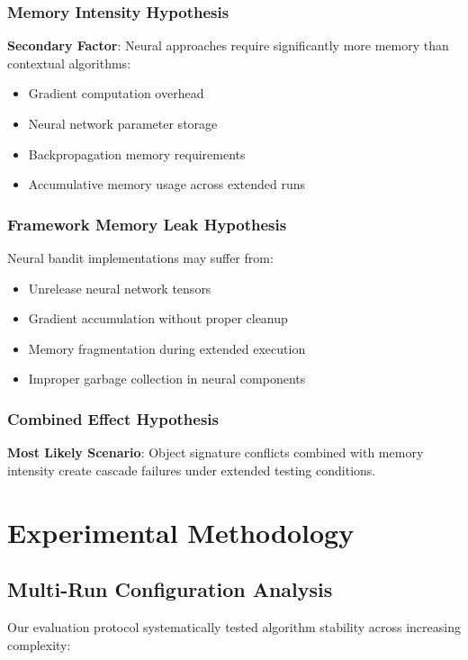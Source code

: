\documentclass[12pt,a4paper]{article}
\newcommand{\critical}[1]{\textcolor{criticalcolor}{\textbf{#1}}}
\newcommand{\warning}[1]{\textcolor{warningcolor}{\textbf{#1}}}
\begin{document}
\subsubsection{Memory Intensity Hypothesis}
\warning{Secondary Factor}: Neural approaches require significantly more memory than contextual algorithms:
\begin{itemize}
\item Gradient computation overhead
\item Neural network parameter storage
\item Backpropagation memory requirements
\item Accumulative memory usage across extended runs
\end{itemize}

\subsubsection{Framework Memory Leak Hypothesis}
Neural bandit implementations may suffer from:
\begin{itemize}
\item Unrelease neural network tensors
\item Gradient accumulation without proper cleanup
\item Memory fragmentation during extended execution
\item Improper garbage collection in neural components
\end{itemize}

\subsubsection{Combined Effect Hypothesis}
\critical{Most Likely Scenario}: Object signature conflicts combined with memory intensity create cascade failures under extended testing conditions.

\section{Experimental Methodology}

\subsection{Multi-Run Configuration Analysis}

Our evaluation protocol systematically tested algorithm stability across increasing complexity:
\end{document}
